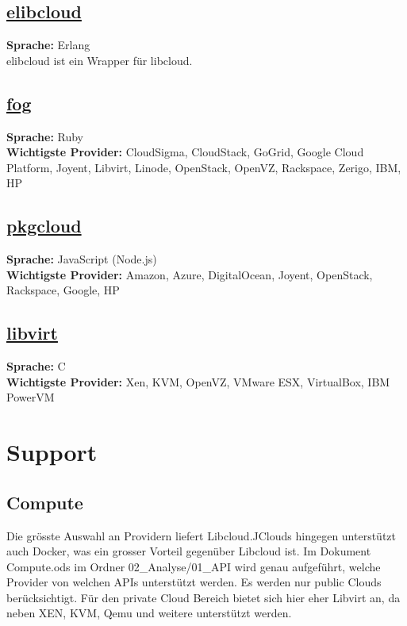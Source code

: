 \documentclass[11pt]{scrartcl}
\begin{document}
\subsection{\href{https://github.com/esl/elibcloud}{elibcloud}}
\textbf{Sprache: }Erlang\\
elibcloud ist ein Wrapper für libcloud.\\

\subsection{\href{https://github.com/fog/fog/blob/master/lib/fog/openstack/docs/getting_started.md}{fog}}
\textbf{Sprache: }Ruby\\
\textbf{Wichtigste Provider: }CloudSigma, CloudStack, GoGrid, Google Cloud Platform, Joyent, 
Libvirt, Linode, OpenStack, OpenVZ, Rackspace, Zerigo, IBM, HP\\

\subsection{\href{https://github.com/pkgcloud/pkgcloud}{pkgcloud}}
\textbf{Sprache: }JavaScript (Node.js)\\
\textbf{Wichtigste Provider: }Amazon, Azure, DigitalOcean, Joyent, OpenStack, Rackspace, Google, HP\\

\subsection{\href{http://http://libvirt.org/}{libvirt}}
\textbf{Sprache: }C\\
\textbf{Wichtigste Provider: }Xen, KVM, OpenVZ, VMware ESX, VirtualBox, IBM PowerVM\\

\newpage

\section{Support}
\subsection{Compute}
Die grösste Auswahl an Providern liefert Libcloud.JClouds hingegen 
unterstützt auch Docker, was ein grosser Vorteil gegenüber Libcloud ist. Im 
Dokument Compute.ods im Ordner 02\_Analyse\//01\_API wird genau aufgeführt, 
welche Provider von welchen APIs unterstützt werden. Es werden nur public Clouds berücksichtigt.
Für den private Cloud Bereich bietet sich hier eher Libvirt an, da neben XEN, 
KVM, Qemu und weitere unterstützt werden.
\end{document}
